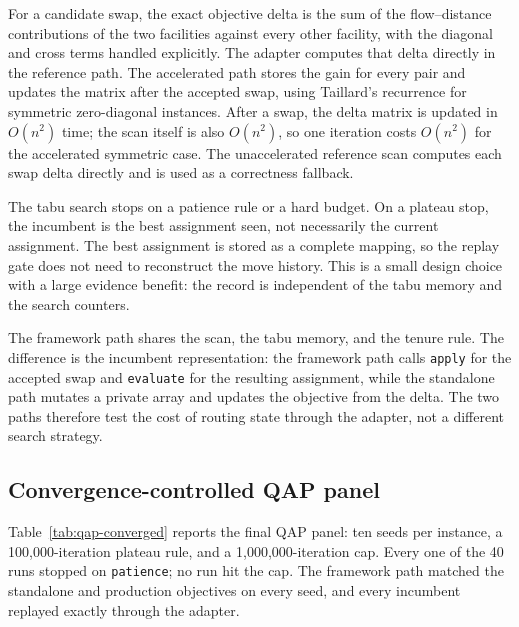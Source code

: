 \documentclass[pdflatex,sn-mathphys-num]{sn-jnl}
\begin{document}
For a candidate swap, the exact objective delta is the sum of the flow--distance contributions of the
two facilities against every other facility, with the diagonal and cross terms handled explicitly.
The adapter computes that delta directly in the reference path. The accelerated path stores the gain
for every pair and updates the matrix after the accepted swap, using Taillard's recurrence for
symmetric zero-diagonal instances. After a swap, the delta matrix is updated in $O(n^2)$ time; the
scan itself is also $O(n^2)$, so one iteration costs $O(n^2)$ for the accelerated symmetric case. The
unaccelerated reference scan computes each swap delta directly and is used as a correctness
fallback.

The tabu search stops on a patience rule or a hard budget. On a plateau stop, the incumbent is the
best assignment seen, not necessarily the current assignment. The best assignment is stored as a
complete mapping, so the replay gate does not need to reconstruct the move history. This is a small
design choice with a large evidence benefit: the record is independent of the tabu memory and the
search counters.

The framework path shares the scan, the tabu memory, and the tenure rule. The difference is the
incumbent representation: the framework path calls \texttt{apply} for the accepted swap and
\texttt{evaluate} for the resulting assignment, while the standalone path mutates a private array
and updates the objective from the delta. The two paths therefore test the cost of routing state
through the adapter, not a different search strategy.

\subsection{Convergence-controlled QAP panel}

Table~\ref{tab:qap-converged} reports the final QAP panel: ten seeds per instance, a 100,000-iteration
plateau rule, and a 1,000,000-iteration cap. Every one of the 40 runs stopped on \texttt{patience};
no run hit the cap. The framework path matched the standalone and production objectives on every
seed, and every incumbent replayed exactly through the adapter.
\end{document}
